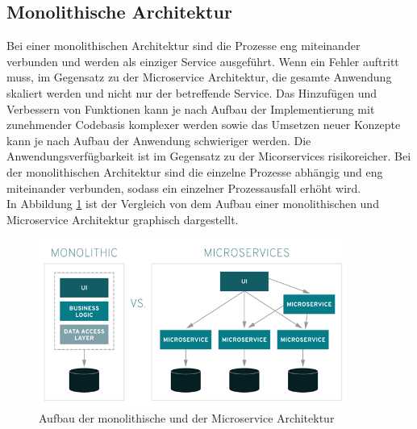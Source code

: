 \subsection{Monolithische Architektur}
Bei einer monolithischen Architektur sind die Prozesse eng miteinander verbunden und werden als einziger Service ausgeführt. Wenn ein Fehler auftritt muss, im Gegensatz zu der Microservice Architektur, die gesamte Anwendung skaliert werden und nicht nur der betreffende Service. Das Hinzufügen und Verbessern von Funktionen kann je nach Aufbau der Implementierung mit zunehmender Codebasis komplexer werden sowie das Umsetzen neuer Konzepte kann je nach Aufbau der Anwendung schwieriger werden. Die Anwendungsverfügbarkeit ist im Gegensatz zu der Micorservices risikoreicher. Bei der monolithischen Architektur sind die einzelne Prozesse abhängig und eng miteinander verbunden, sodass ein einzelner Prozessausfall erhöht wird.\\
In Abbildung \ref{mono} ist der Vergleich von dem Aufbau einer monolithischen und Microservice Architektur graphisch dargestellt.
\begin{figure}[bth] 
	\centering
	\includegraphics[width=0.9\textwidth]{Graphics/monoVsMicro.png}
	\caption{Aufbau der monolithische und der Microservice Architektur}
	\label{mono}
\end{figure}\\

